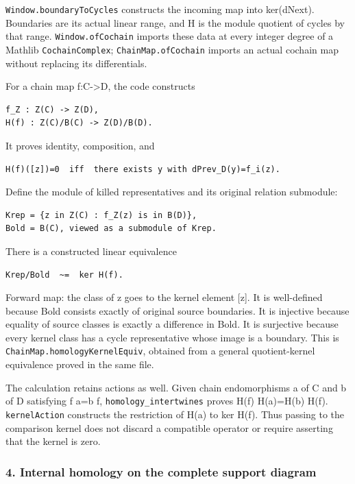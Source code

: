 \nolinkurl{Window.boundaryToCycles} constructs the incoming map into ker(dNext). Boundaries are its
actual linear range, and H is the module quotient of cycles by that range. \nolinkurl{Window.ofCochain}
imports these data at every integer degree of a Mathlib \nolinkurl{CochainComplex};
\nolinkurl{ChainMap.ofCochain} imports an actual cochain map without replacing its differentials.

For a chain map f:C-\textgreater D, the code constructs

\begin{verbatim}
f_Z : Z(C) -> Z(D),
H(f) : Z(C)/B(C) -> Z(D)/B(D).
\end{verbatim}

It proves identity, composition, and

\begin{verbatim}
H(f)([z])=0  iff  there exists y with dPrev_D(y)=f_i(z).
\end{verbatim}

Define the module of killed representatives and its original relation submodule:

\begin{verbatim}
Krep = {z in Z(C) : f_Z(z) is in B(D)},
Bold = B(C), viewed as a submodule of Krep.
\end{verbatim}

There is a constructed linear equivalence

\begin{verbatim}
Krep/Bold  ~=  ker H(f).
\end{verbatim}

Forward map: the class of z goes to the kernel element {[}z{]}. It is well-defined because Bold
consists exactly of original source boundaries. It is injective because equality of source classes
is exactly a difference in Bold. It is surjective because every kernel class has a cycle
representative whose image is a boundary. This is \nolinkurl{ChainMap.homologyKernelEquiv}, obtained
from a general quotient-kernel equivalence proved in the same file.

The calculation retains actions as well. Given chain endomorphisms a of C and b of D satisfying f
a=b f, \nolinkurl{homology_intertwines} proves H(f) H(a)=H(b) H(f). \nolinkurl{kernelAction} constructs
the restriction of H(a) to ker H(f). Thus passing to the comparison kernel does not discard a
compatible operator or require asserting that the kernel is zero.

\subsubsection{4. Internal homology on the complete support
diagram}\label{derived_main:internal-homology-on-the-complete-support-diagram}

